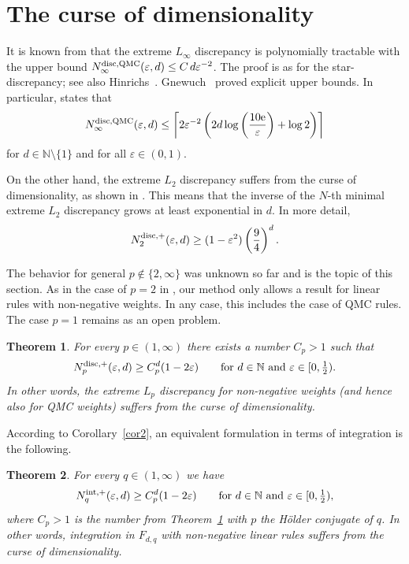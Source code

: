 \documentclass[12pt]{article}
\newtheorem{thm}{Theorem}
\theoremstyle{remark}
\theoremstyle{definition}
\newcommand{\qmc}{{\rm QMC}}
\newcommand{\<}{\langle}
\renewcommand{\>}{\rangle}
\begin{document}
\section{The curse of dimensionality}\label{sec:curse}

It is known from \cite{hnww} that the extreme $L_{\infty}$ discrepancy is polynomially tractable with the upper bound $N_\infty^{{\rm disc},\qmc}(\varepsilon,d) \le  C \, d \varepsilon^{-2}$. The proof is as for the star-discrepancy; see also Hinrichs~\cite{Hi04}. Gnewuch~\cite{Gne05,Gne08} proved explicit upper bounds. In particular, \cite[Theorem~2.2]{Gne08} states that $$N_\infty^{{\rm disc},\qmc}(\varepsilon,d) \le \left\lceil 2 
\varepsilon^{-2} \left(2 d \log\left(\frac{10 {\rm e}}{\varepsilon}\right)+\log 2\right)\right\rceil$$ 
for $d \in \mathbb{N}\setminus\{1\}$ and for all $\varepsilon \in (0,1)$.

On the other hand, the extreme $L_2$ discrepancy suffers from the curse of dimensionality, as shown in \cite[p.~93-94]{NW10}. This means that the inverse of the $N$-th minimal extreme $L_2$ discrepancy grows at least exponential in $d$. In more detail, 
$$N_2^{{\rm disc},+}(\varepsilon,d) \ge (1-\varepsilon^2) \left(\frac{9}{4}\right)^d.$$

The behavior for general $p \not\in \{2,\infty\}$ was unknown so far and is the topic of this section. As in the case of $p=2$ in \cite{NW10}, our method only allows a result for linear rules with non-negative weights. In any case, this includes the case of QMC rules. The case $p=1$ remains as an open problem.

\begin{thm}\label{thm:main2}
For every $p \in (1,\infty)$ there exists a number $C_p>1$ such that $$N_p^{{\rm disc},+}(\varepsilon,d) \ge C_p^d (1-2 \varepsilon) \qquad \mbox{for $d \in \mathbb{N}$ and $\varepsilon \in [0,\tfrac{1}{2})$.}$$ In other words, the extreme $L_p$ discrepancy for non-negative weights (and hence also for QMC weights) suffers from the curse of dimensionality.
\end{thm}

According to Corollary~\ref{cor2}, an equivalent formulation in terms of integration is the following.

\begin{thm}\label{thm:main3}
For every $q \in (1,\infty)$ we have $$N_q^{{\rm int},+}(\varepsilon,d) \ge C_p^d (1-2 \varepsilon) \qquad \mbox{for $d \in \mathbb{N}$ and $\varepsilon \in [0,\tfrac{1}{2})$,}$$ where $C_p>1$ is the number  from Theorem~\ref{thm:main2} with $p$ the H\"older conjugate of $q$.
In other words, integration in $F_{d,q}$ with non-negative linear rules suffers from the curse of dimensionality.
\end{thm}
\end{document}
